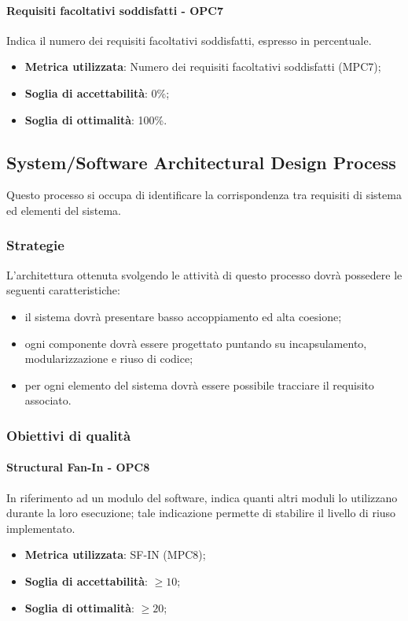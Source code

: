 \documentclass[PdQ.tex]{subfiles}
\begin{document}
			\paragraph{Requisiti facoltativi soddisfatti - OPC7}
			Indica il numero dei requisiti facoltativi soddisfatti, espresso in percentuale.
			\begin{itemize}
					\item \textbf{Metrica utilizzata}: Numero dei requisiti facoltativi soddisfatti (MPC7);
					\item \textbf{Soglia di accettabilità}: 0\%;
					\item \textbf{Soglia di ottimalità}: 100\%.
			\end{itemize}
		
	\subsection{System/Software Architectural Design Process}
		Questo processo si occupa di identificare la corrispondenza tra requisiti di sistema ed elementi del sistema.
		
		\subsubsection{Strategie}
		L'architettura ottenuta svolgendo le attività di questo processo dovrà possedere le seguenti caratteristiche:
		\begin{itemize}
		\item il sistema dovrà presentare basso accoppiamento ed alta coesione;
		\item ogni componente dovrà essere progettato puntando su incapsulamento, modularizzazione e riuso di codice;
		\item per ogni elemento del sistema dovrà essere possibile tracciare il requisito associato.
		\end{itemize}
		
		\subsubsection{Obiettivi di qualità}
			\paragraph{Structural Fan-In - OPC8}
			In riferimento ad un modulo del software, indica quanti altri moduli lo utilizzano durante la
			loro esecuzione; tale indicazione permette di stabilire il livello di riuso implementato. 
			\begin{itemize}
					\item \textbf{Metrica utilizzata}: SF-IN (MPC8);
					\item \textbf{Soglia di accettabilità}: \begin{math}\geq 10\end{math};
					\item \textbf{Soglia di ottimalità}: \begin{math}\geq 20\end{math};
			\end{itemize}
\end{document}
